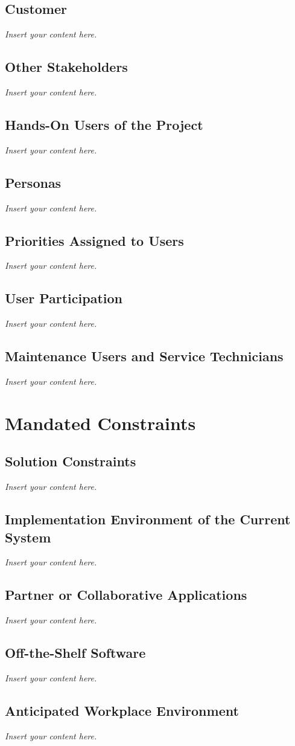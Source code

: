 \documentclass[12pt]{article}
\newcommand{\lips}{\textit{Insert your content here.}}
\begin{document}
\subsection{Customer}
\lips
\subsection{Other Stakeholders}
\lips
\subsection{Hands-On Users of the Project}
\lips
\subsection{Personas}
\lips
\subsection{Priorities Assigned to Users}
\lips
\subsection{User Participation}
\lips
\subsection{Maintenance Users and Service Technicians}
\lips

\section{Mandated Constraints}
\subsection{Solution Constraints}
\lips
\subsection{Implementation Environment of the Current System}
\lips
\subsection{Partner or Collaborative Applications}
\lips
\subsection{Off-the-Shelf Software}
\lips
\subsection{Anticipated Workplace Environment}
\lips
\end{document}
